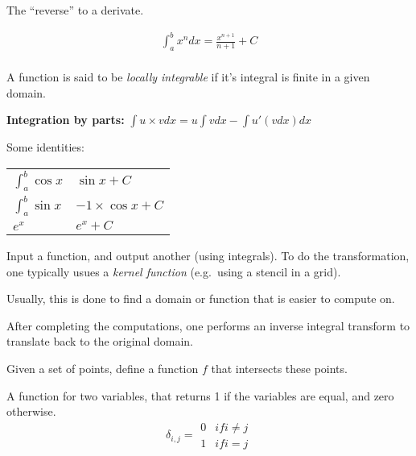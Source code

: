 \begin{definition}[Integral]
    The ``reverse'' to a derivate. 

    \begin{align}
        \int_{a}^{b}x^{n} dx = \frac{x^{n+1}}{n+1} + C \\
    \end{align}

    A function is said to be \textit{locally integrable} if it's integral is 
    finite in a given domain.

    \textbf{Integration by parts:} $\int{u \times v dx} = u\int{v dx} - \int{u\prime{(v dx)}}dx $

    Some identities:
    \begin{longtable}{|l|l|}
        $\int_{a}^{b}\cos{x} $ & $\sin{x} + C $ \\
    $\int_{a}^{b}\sin{x}$ & $-1 \times \cos{x} + C $\\
    $e^{x}$ & $e^{x} + C $
    \end{longtable}

\end{definition}

\begin{definition}\label{inttrans}
    Input a function, and output another (using integrals).
    To do the transformation, one typically usues a \textit{kernel function} (e.g.\ 
    using a stencil in a grid).

    Usually, this is done to find a domain or function that is easier to compute
    on. 

    After completing the computations, one performs an inverse integral transform
    to translate back to the original domain.
\end{definition}

\begin{definition}
    Given a set of points, define a function $f$ that intersects these points.
\end{definition}

\begin{definition}
    A function for two variables, that returns 1 if the variables are equal,
    and zero otherwise.
    $$
    \delta_{i,j} = \begin{array}{ll}
        0 & if i \neq j \\
        1 & if i = j
        \end{array}
    $$
\end{definition}

